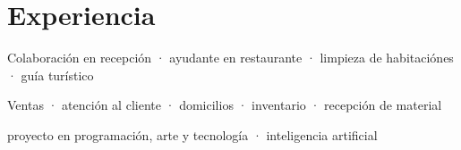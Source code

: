 \documentclass[]{plushcv}
\begin{document}
\begin{minipage}[t]{0.70\textwidth} 


\section{Experiencia}

\sectionsep
{}
\vspace{\topsep} %
\begin{tightemize}
\sectionsep
\item Colaboración en recepción · ayudante en restaurante · limpieza de habitaciónes · guía turístico
\end{tightemize}
\sectionsep

\sectionsep
{}
\begin{tightemize}
\sectionsep
\item Ventas · atención al cliente · domicilios · inventario · recepción de material
\end{tightemize}
\sectionsep

  
\sectionsep
{}
\begin{tightemize}
\sectionsep
\item proyecto en programación, arte y tecnología  ·  inteligencia artificial 
\end{tightemize}
\sectionsep


\end{minipage}
\end{document}
